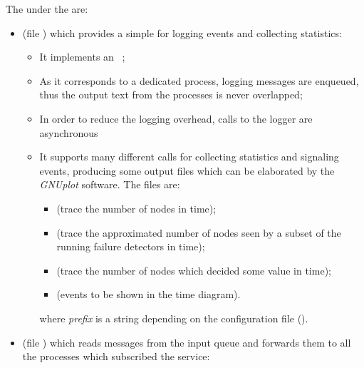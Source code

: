 The  under the  
are:
\begin{itemize}

\item   {} (file )
        which provides a simple  for logging events and
        collecting statistics:

    \begin{itemize}

    \item   It implements an \OTP\ ;

    \item   As it corresponds to a dedicated process, logging messages are
            enqueued, thus the output text from the processes is never
            overlapped;

    \item   In order to reduce the logging overhead, calls to the logger
            are asynchronous

    \item   It supports many different calls for collecting statistics and
            signaling events, producing some output files which can be
            elaborated by the \emph{GNUplot} software. The files are:
        \begin{itemize}
        \item   {} (trace
                the number of nodes in time);
        \item   {}
                (trace the approximated number of nodes seen by a subset
                of the running failure detectors in time);
        \item   {}
                (trace the number of nodes which decided some value in
                time);
        \item   {} (events to
                be shown in the time diagram).
        \end{itemize}
            where \emph{prefix} is a string depending on
            the configuration file ().

    \end{itemize}

\item   {} (file ) which
        reads messages from the input queue and forwards them to all the
        processes which subscribed the service:
    \begin{itemize}


\end{itemize}
\end{itemize}
